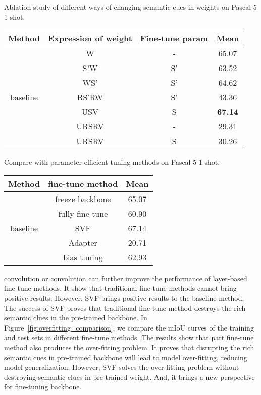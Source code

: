 \documentclass{article}
\begin{document}
\begin{minipage}{\textwidth}
\begin{minipage}{0.5\textwidth}\scriptsize
\centering
\makeatletter{}\makeatother
\caption{Ablation study of different ways of changing semantic cues in weights on Pascal-5 1-shot.}
\vspace{+.2em}
\label{tab:ursrv}
\begin{tabular}{c|c|c|c}
\hline
Method & Expression of weight& Fine-tune param & Mean  \\ \hline
\multirow{7}{*}{baseline} & W &- &  65.07 \\
&               S'W &S'	&	63.52 \\
&               WS' &S'	&	64.62 \\
&               RS'RW &S'	&	43.36 \\
&               USV &S	&	\textbf{67.14} \\
 &  URSRV & - &  29.31 \\
&              URSRV & S	&	30.26 \\ \hline 
\end{tabular}
\end{minipage}
\hspace{1.5em}
\begin{minipage}{0.45\textwidth}
\centering
\makeatletter{}\makeatother
\caption{Compare with parameter-efficient tuning methods on Pascal-5 1-shot.}
\vspace{+.3em}
\label{tab:adapter}
\begin{tabular}{c|c|c}
\hline
Method & fine-tune method & Mean  \\ \hline
\multirow{5}{*}{baseline} & freeze backbone &  65.07 \\
	& fully fine-tune& 60.90\\			
    & SVF &	67.14 \\
    & Adapter & 	20.71 \\  
    & bias tuning  &	62.93 \\ \hline 
\end{tabular}
\end{minipage}
\end{minipage}


convolution or  convolution can further improve the performance of layer-based fine-tune methods. It show that traditional fine-tune methods cannot bring positive results. However, SVF brings positive results to the baseline method. The success of SVF proves that traditional fine-tune method destroys the rich semantic clues in the pre-trained backbone. In Figure~\ref{fig:overfitting_comparison}, we compare the mIoU curves of the training and test sets in different fine-tune methods. The results show that part fine-tune method also produces the over-fitting problem. It proves that disrupting the rich semantic cues in pre-trained backbone will lead to model over-fitting, reducing model generalization. However, SVF solves the over-fitting problem without destroying semantic clues in pre-trained weight. And, it brings a new perspective for fine-tuning backbone.
\end{document}
